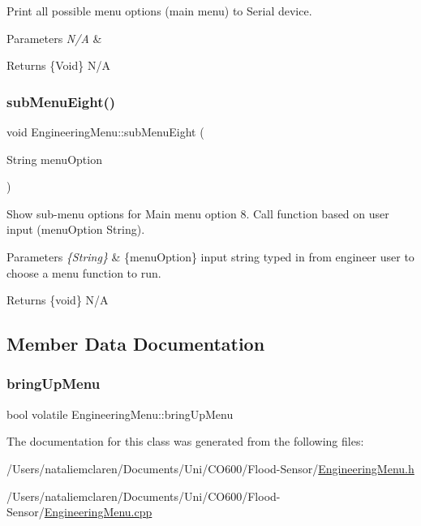 Print all possible menu options (main menu) to Serial device. 
\begin{DoxyParams}{Parameters}
{\em N/A} & \\
\hline
\end{DoxyParams}
\begin{DoxyReturn}{Returns}
\{Void\} N/A 
\end{DoxyReturn}
\mbox{\label{class_engineering_menu_adc87bea9b0a4ae094eb4ae87fac5b9a7}} 
\subsubsection{\texorpdfstring{sub\+Menu\+Eight()}{subMenuEight()}}
{\footnotesize\ttfamily void Engineering\+Menu\+::sub\+Menu\+Eight (\begin{DoxyParamCaption}\item[{String}]{menu\+Option }\end{DoxyParamCaption})}

Show sub-\/menu options for Main menu option 8. Call function based on user input (menu\+Option String). 
\begin{DoxyParams}{Parameters}
{\em \{\+String\}} & \{menu\+Option\} input string typed in from engineer user to choose a menu function to run. \\
\hline
\end{DoxyParams}
\begin{DoxyReturn}{Returns}
\{void\} N/A 
\end{DoxyReturn}


\subsection{Member Data Documentation}
\mbox{\label{class_engineering_menu_a77d214538bd5dbf2be427351701f71b7}} 
\subsubsection{\texorpdfstring{bring\+Up\+Menu}{bringUpMenu}}
{\footnotesize\ttfamily bool volatile Engineering\+Menu\+::bring\+Up\+Menu}



The documentation for this class was generated from the following files\+:\begin{DoxyCompactItemize}
\item 
/\+Users/nataliemclaren/\+Documents/\+Uni/\+C\+O600/\+Flood-\/\+Sensor/\mbox{\hyperlink{_engineering_menu_8h}{Engineering\+Menu.\+h}}\item 
/\+Users/nataliemclaren/\+Documents/\+Uni/\+C\+O600/\+Flood-\/\+Sensor/\mbox{\hyperlink{_engineering_menu_8cpp}{Engineering\+Menu.\+cpp}}\end{DoxyCompactItemize}
